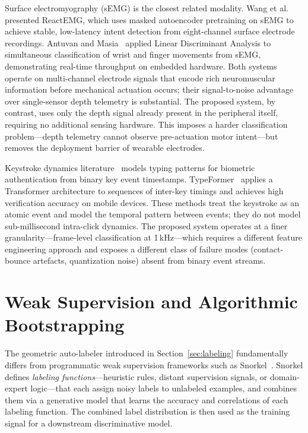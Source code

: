 Surface electromyography (sEMG) is the closest related modality. Wang et al.~\cite{reactemg} presented ReactEMG, which uses masked autoencoder pretraining on sEMG to achieve stable, low-latency intent detection from eight-channel surface electrode recordings. Antuvan and Masia~\cite{lda_emg} applied Linear Discriminant Analysis to simultaneous classification of wrist and finger movements from sEMG, demonstrating real-time throughput on embedded hardware. Both systems operate on multi-channel electrode signals that encode rich neuromuscular information before mechanical actuation occurs; their signal-to-noise advantage over single-sensor depth telemetry is substantial. The proposed system, by contrast, uses only the depth signal already present in the peripheral itself, requiring no additional sensing hardware. This imposes a harder classification problem---depth telemetry cannot observe pre-actuation motor intent---but removes the deployment barrier of wearable electrodes.

Keystroke dynamics literature~\cite{typeformer2022, continuous_keystroke_mdpi} models typing patterns for biometric authentication from binary key event timestamps. TypeFormer~\cite{typeformer2022} applies a Transformer architecture to sequences of inter-key timings and achieves high verification accuracy on mobile devices. These methods treat the keystroke as an atomic event and model the temporal pattern between events; they do not model sub-millisecond intra-click dynamics. The proposed system operates at a finer granularity---frame-level classification at 1\,kHz---which requires a different feature engineering approach and exposes a different class of failure modes (contact-bounce artefacts, quantization noise) absent from binary event streams.

\section{Weak Supervision and Algorithmic Bootstrapping}

The geometric auto-labeler introduced in Section~\ref{sec:labeling} fundamentally differs from programmatic weak supervision frameworks such as Snorkel~\cite{ratner_snorkel_2020}. Snorkel defines \emph{labeling functions}---heuristic rules, distant supervision signals, or domain-expert logic---that each assign noisy labels to unlabeled examples, and combines them via a generative model that learns the accuracy and correlations of each labeling function. The combined label distribution is then used as the training signal for a downstream discriminative model.

